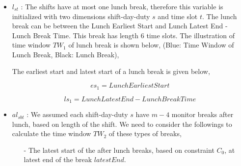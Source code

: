 \begin{itemize}
\item $l_{st}$ : The shifts have at most one lunch break, therefore this variable is initialized with two dimensions shift-day-duty $s$ and time slot $t$. The lunch break can be between the Lunch Earliest Start and Lunch Latest End - Lunch Break Time. This break has length 6 time slots. The illustration of time window $TW_1$  of lunch break is shown below, (Blue: Time Window of Lunch Break, Black: Lunch Break), \\


The earliest start and latest start of a lunch break is given below,

\begin{equation}
es_1 =  Lunch Earliest Start 
\end{equation}

\begin{equation}
ls_1 =  Lunch Latest End - Lunch Break Time
\end{equation}

\item $al_{sbt}$ : We assumed each shift-day-duty $s$ have $m-4$ monitor breaks after lunch, based on length of the shift. We need to consider the followings to calculate the time window $TW_2$ of these types of breaks, 

\begin{itemize}

\item[-] The latest start of the after lunch breaks, based on constraint $C_0$, at  latest end of the break $latestEnd$. 


\end{itemize}
\end{itemize}

